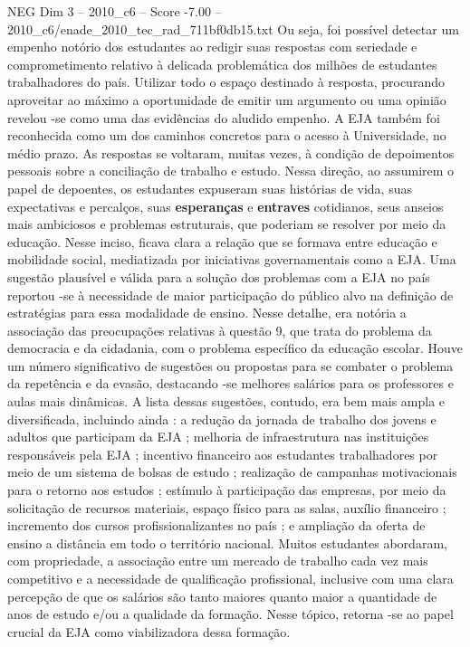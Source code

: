 \begin{textsample}{NEG Dim 3 – 2010\_c6 – Score -7.00 – 2010\_c6/enade\_2010\_tec\_rad\_711bf0db15.txt}
Ou seja, foi possível detectar um empenho notório dos estudantes ao redigir suas respostas com seriedade e comprometimento relativo à delicada problemática dos milhões de estudantes trabalhadores do país.
Utilizar todo o espaço destinado à resposta, procurando aproveitar ao máximo a oportunidade de emitir um argumento ou uma opinião revelou -se como uma das evidências do aludido empenho.
A EJA também foi reconhecida como um dos caminhos concretos para o acesso à Universidade, no médio prazo.
As respostas se voltaram, muitas vezes, à condição de depoimentos pessoais sobre a conciliação de trabalho e estudo.
Nessa direção, ao assumirem o papel de depoentes, os estudantes expuseram suas histórias de vida, suas expectativas e percalços, suas \textbf{esperanças} e \textbf{entraves} cotidianos, seus anseios mais ambiciosos e problemas estruturais, que poderiam se resolver por meio da educação.
Nesse inciso, ficava clara a relação que se formava entre educação e mobilidade social, mediatizada por iniciativas governamentais como a EJA.
Uma sugestão plausível e válida para a solução dos problemas com a EJA no país reportou -se à necessidade de maior participação do público alvo na definição de estratégias para essa modalidade de ensino.
Nesse detalhe, era notória a associação das preocupações relativas à questão 9, que trata do problema da democracia e da cidadania, com o problema específico da educação escolar.
Houve um número significativo de sugestões ou propostas para se combater o problema da repetência e da evasão, destacando -se melhores salários para os professores e aulas mais dinâmicas.
A lista dessas sugestões, contudo, era bem mais ampla e diversificada, incluindo ainda : a redução da jornada de trabalho dos jovens e adultos que participam da EJA ; melhoria de infraestrutura nas instituições responsáveis pela EJA ; incentivo financeiro aos estudantes trabalhadores por meio de um sistema de bolsas de estudo ; realização de campanhas motivacionais para o retorno aos estudos ; estímulo à participação das empresas, por meio da solicitação de recursos materiais, espaço físico para as salas, auxílio financeiro ; incremento dos cursos profissionalizantes no país ; e ampliação da oferta de ensino a distância em todo o território nacional.
Muitos estudantes abordaram, com propriedade, a associação entre um mercado de trabalho cada vez mais competitivo e a necessidade de qualificação profissional, inclusive com uma clara percepção de que os salários são tanto maiores quanto maior a quantidade de anos de estudo e/ou a qualidade da formação.
Nesse tópico, retorna -se ao papel crucial da EJA como viabilizadora dessa formação.

\end{textsample}
